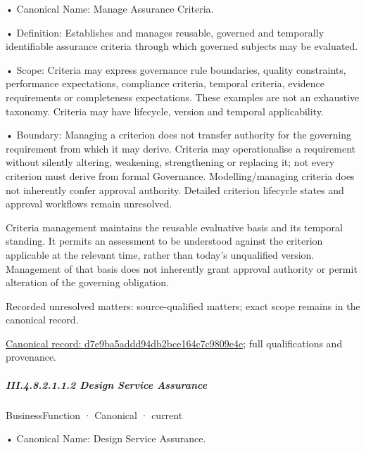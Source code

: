 •
Canonical Name: Manage Assurance Criteria.



•
Definition: Establishes and manages reusable, governed and temporally identifiable assurance criteria through which governed subjects may be evaluated.



•
Scope: Criteria may express governance rule boundaries, quality constraints, performance expectations, compliance criteria, temporal criteria, evidence requirements or completeness expectations. These examples are not an exhaustive taxonomy. Criteria may have lifecycle, version and temporal applicability.



•
Boundary: Managing a criterion does not transfer authority for the governing requirement from which it may derive. Criteria may operationalise a requirement without silently altering, weakening, strengthening or replacing it; not every criterion must derive from formal Governance. Modelling/managing criteria does not inherently confer approval authority. Detailed criterion lifecycle states and approval workflows remain unresolved.



Criteria management maintains the reusable evaluative basis and its temporal standing. It permits an assessment to be understood against the criterion applicable at the relevant time, rather than today's unqualified version. Management of that basis does not inherently grant approval authority or permit alteration of the governing obligation.


{\small Recorded unresolved matters: source-qualified matters; exact scope remains in the canonical record.}\par
{\footnotesize \href{../../../../../../../../continuum/business/business-function/d7e9ba5addd94db2bce164c7c9809e4e.md}{Canonical record: d7e9ba5addd94db2bce164c7c9809e4e}; full qualifications and provenance.}\par
\subparagraph*{III.4.8.2.1.1.2 Design Service Assurance}
\label{navigation:III.4.8.2.1.1.2}

\label{element:6668aa8daf964fec93fce42d48b37ad1}
{\small BusinessFunction · Canonical · current}\par

•
Canonical Name: Design Service Assurance.



